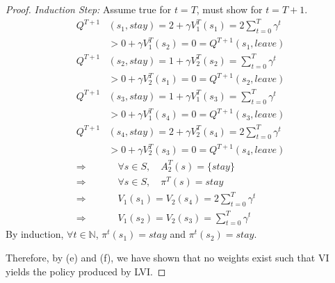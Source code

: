 \begin{proof}
\emph{Induction Step:} Assume true for $t = T$, must show for $t = T + 1$.
\begin{align*}
    Q^{T+1}&(s_1, stay) = 2 + \gamma V_1^T(s_1) = 2 \sum_{t=0}^T \gamma^t \\
        &> 0 + \gamma V_1^T(s_2) = 0 = Q^{T+1}(s_1, leave) \\
    Q^{T+1}&(s_2, stay) = 1 + \gamma V_2^T(s_2) = \sum_{t=0}^T \gamma^t \\
        &> 0 + \gamma V_2^T(s_1) = 0 = Q^{T+1}(s_2, leave) \\
    Q^{T+1}&(s_3, stay) = 1 + \gamma V_1^T(s_3) = \sum_{t=0}^T \gamma^t \\
        &> 0 + \gamma V_1^T(s_4) = 0 = Q^{T+1}(s_3, leave) \\
    Q^{T+1}&(s_4, stay) = 2 + \gamma V_2^T(s_4) = 2 \sum_{t=0}^T \gamma^t \\
        &> 0 + \gamma V_2^T(s_3) = 0 = Q^{T+1}(s_4, leave) \\
    \Rightarrow \quad &\quad \forall s \in S, \quad A_2^T(s) = \{stay\} \\
    \Rightarrow \quad &\quad \forall s \in S, \quad \pi^T(s) = stay \\
    \Rightarrow \quad &\quad V_1(s_1) = V_2(s_4) = 2 \sum_{t=0}^T \gamma^t \\
    \Rightarrow \quad &\quad V_1(s_2) = V_2(s_3) = \sum_{t=0}^T \gamma^t
\end{align*}
By induction, $\forall t \in \mathbb{N}$, $\pi^t(s_1) = stay$ and $\pi^t(s_2) = stay$.

Therefore, by (e) and (f), we have shown that no weights exist such that VI yields the policy produced by LVI.
\end{proof}


